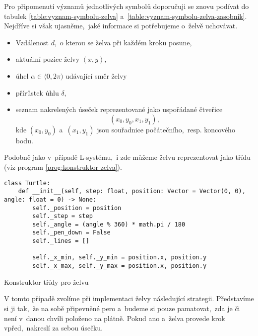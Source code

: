 Pro připomenutí významů jednotlivých symbolů doporučuji se znovu podívat do tabulek \ref{table:vyznam-symbolu-zelva} a~\ref{table:vyznam-symbolu-zelva-zasobnik}. Nejdříve si však ujasněme,~jaké informace si potřebujeme o~želvě uchovávat.
\begin{itemize}
    \item Vzdálenost $d$,~o kterou se želva při každém kroku posune,
    \item aktuální pozice želvy $(x,y)$,
    \item úhel $\alpha\in\langle 0,2\pi)$ udávající směr želvy
    \item přírůstek úhlu $\delta$,
    \item seznam nakrelených úseček reprezentované jako uspořádané čtveřice
    \[(x_0,y_0,x_1,y_1),\]
    kde $(x_0,y_0)$ a~$(x_1,y_1)$ jsou souřadnice počátečního,~resp. koncového bodu.
\end{itemize}
Podobně jako v~případě L-systému,~i zde můžeme želvu reprezentovat jako třídu (viz program \ref{prog:konstruktor-zelva}).
\begin{program}[h]
\begin{lstlisting}[style=python]
class Turtle:
    def __init__(self, step: float, position: Vector = Vector(0, 0), angle: float = 0) -> None:
        self._position = position
        self._step = step
        self._angle = (angle % 360) * math.pi / 180
        self._pen_down = False
        self._lines = []

        self._x_min, self._y_min = position.x, position.y
        self._x_max, self._y_max = position.x, position.y
\end{lstlisting}
    \caption{Konstruktor třídy pro želvu}
    \label{prog:konstruktor-zelva}
\end{program}

V tomto případě zvolíme při implementaci želvy následující strategii. Představíme si ji tak,~že na sobě připevněné pero a~budeme si pouze pamatovat,~zda je či není v~danou chvíli položeno na plátně. Pokud ano a~želva provede krok vpřed,~nakreslí za sebou úsečku.

